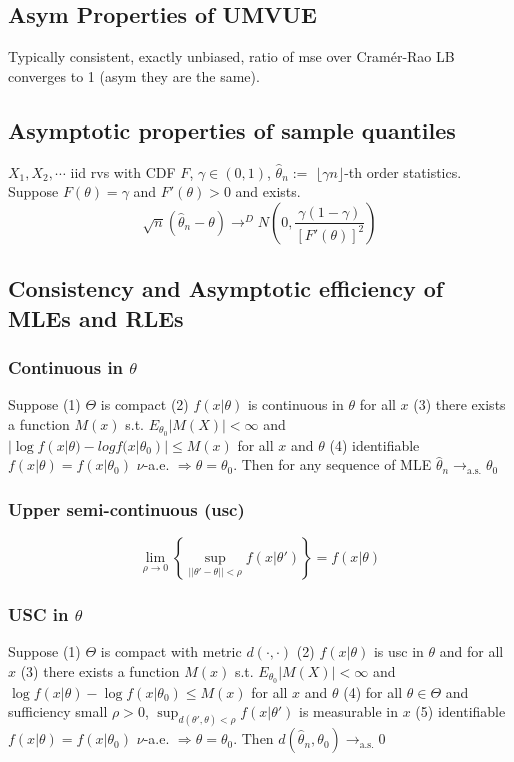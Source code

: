 \subsection{Asym Properties of UMVUE}

Typically consistent, exactly unbiased, ratio of mse over Cramér-Rao LB converges to 1 (asym they are the same).

\subsection{Asymptotic properties of sample quantiles}

$X_1, X_2, \cdots$ iid rvs with CDF $F$, $\gamma\in(0, 1)$, $\hat\theta_n :=$ $\lfloor{\gamma n}\rfloor$-th order statistics. Suppose $F(\theta)=\gamma$ and $F'(\theta) > 0$ and exists.
$$
\sqrt{n}(\hat\theta_n-\theta)\rightarrow^{D} N\left(0, \frac{\gamma(1-\gamma)}{[F'(\theta)]^2}\right)
$$

\subsection{Consistency and Asymptotic efficiency of MLEs and RLEs}

\subsubsection{Continuous in $\theta$}

Suppose (1) $\Theta$ is compact (2) $f(x|\theta)$ is continuous in $\theta$ for all $x$ (3) there exists a function $M(x)$ s.t. $E_{\theta_0}|M(X)| < \infty$ and $|\log f(x|\theta) - log f(x|\theta_0)| \leq M(x)$ for all $x$ and $\theta$ (4) identifiable $f(x|\theta)=f(x|\theta_0)$ $\nu$-a.e. $\Rightarrow \theta = \theta_0$. Then for any sequence of MLE $\hat\theta_n\rightarrow_{\text{a.s.}}\theta_0$

\subsubsection{Upper semi-continuous (usc)}

$$
\lim_{\rho\rightarrow0} \left\{
    \sup_{||\theta'-\theta||<\rho} f(x|\theta')
\right\} = f(x|\theta)
$$

\subsubsection{USC in $\theta$}

Suppose (1) $\Theta$ is compact with metric $d(\cdot, \cdot)$ (2) $f(x|\theta)$ is usc in $\theta$ and for all $x$ (3) there exists a function $M(x)$ s.t. $E_{\theta_0}|M(X)| < \infty$ and $\log f(x|\theta)-\log f(x|\theta_0) \leq M(x)$ for all $x$ and $\theta$ (4) for all $\theta\in\Theta$ and sufficiency small $\rho >0$, $\sup_{d(\theta', \theta)<\rho} f(x|\theta')$ is measurable in $x$ (5) identifiable $f(x|\theta)=f(x|\theta_0)$ $\nu$-a.e. $\Rightarrow \theta=\theta_0$. Then $d(\hat\theta_n, \theta_0)\rightarrow_{\text{a.s.}}0$

